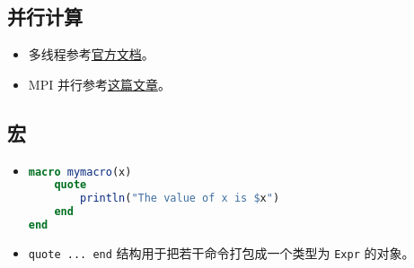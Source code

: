 \subsection{并行计算}
\begin{itemize}
\item 多线程参考\href{https://docs.julialang.org/en/v1/manual/multi-threading/}{官方文档}。
\item MPI 并行参考\href{http://www.claudiobellei.com/2018/09/30/julia-mpi/}{这篇文章}。
\end{itemize}

\subsection{宏}
\begin{itemize}
\item 
\begin{lstlisting}[language=julia]
macro mymacro(x)
    quote
        println("The value of x is $x")
    end
end
\end{lstlisting}
\item \verb|quote ... end| 结构用于把若干命令打包成一个类型为 \verb|Expr| 的对象。
\end{itemize}
